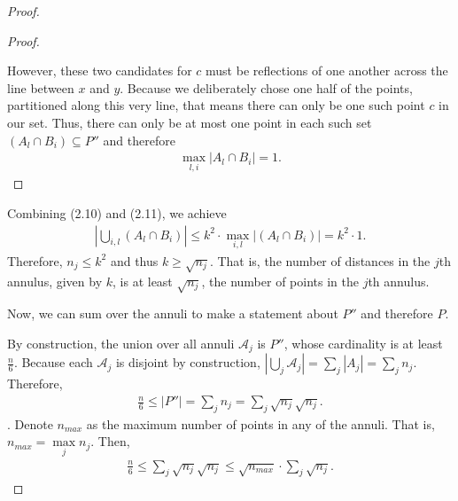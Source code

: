 \documentclass{scrippsthesisclass}
\theoremstyle{definition}
\begin{document}
\begin{proof}
\begin{proof}
\begin{center}
\end{center}

    However, these two candidates for $c$ must be reflections of one another across the line between $x$ and $y$.
    Because we deliberately chose one half of the points, partitioned along this very line, that means there can only be one such point $c$ in our set.
    Thus, there can only be at most one point in each such set $(A_l \cap B_i) \subseteq P''$ and therefore
    \begin{align}
        \max_{l, i} \left|A_l \cap B_i \right| = 1.
    \end{align}
    \end{proof}

    Combining (2.10) and (2.11), we achieve
    \begin{align}
    \left| \bigcup \limits_{i, l} (A_l \cap B_i) \right| \leq k^2 \cdot \max_{i, l} \left| (A_l \cap B_i) \right| = k^2 \cdot 1. 
    \end{align}
    Therefore, $n_j \leq k^2$ and thus $k \geq \sqrt{n_j}$.
    That is, the number of distances in the $j$th annulus, given by $k$, is at least $\sqrt{n_j}$, the number of points in the $j$th annulus.

    Now, we can sum over the annuli to make a statement about $P''$ and therefore $P$.

    By construction, the union over all annuli $\mathcal{A}_j$ is $P''$, whose cardinality is at least $\frac{n}{6}$. 
    Because each $\mathcal{A}_j$ is disjoint by construction, $\left| \bigcup_{j} \mathcal{A}_j \right| = \sum_j |A_j| = \sum_j n_j$.
    Therefore, 
    \begin{align}
    \frac{n}{6} \leq |P''| = \sum_j n_j = \sum_j \sqrt{n_j} \sqrt{n_j}.
    \end{align}. 
    Denote $n_{max}$ as the maximum number of points in any of the annuli.
    That is, $n_{max} = \max \limits_j n_j$.
    Then, 
    \begin{align}
    \frac{n}{6} \leq \sum_j \sqrt{n_j} \sqrt{n_j} \leq \sqrt{n_{max}} \cdot \sum_j \sqrt{n_j}. 
    \end{align}


\end{proof}
\end{document}
